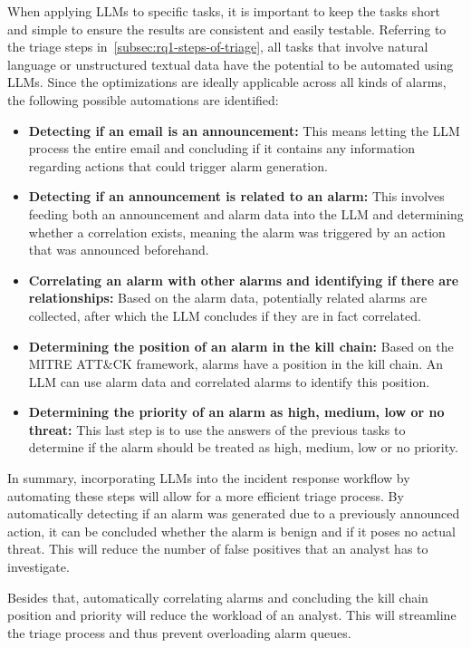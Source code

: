 When applying LLMs to specific tasks, it is important to keep the tasks short and simple to ensure the results are
consistent and easily testable.
Referring to the triage steps in\ \ref{subsec:rq1-steps-of-triage}, all tasks that involve natural language or
unstructured textual data have the potential to be automated using LLMs.
Since the optimizations are ideally applicable across all kinds of alarms, the following possible automations are
identified:
\begin{itemize}
    \item \textbf{Detecting if an email is an announcement:}
    This means letting the LLM process the entire email and concluding if it contains any information regarding actions
    that could trigger alarm generation.

    \item \textbf{Detecting if an announcement is related to an alarm:}
    This involves feeding both an announcement and alarm data into the LLM and determining whether a correlation
    exists, meaning the alarm was triggered by an action that was announced beforehand.

    \item \textbf{Correlating an alarm with other alarms and identifying if there are relationships:}
    Based on the alarm data, potentially related alarms are collected, after which the LLM concludes if they are in
    fact correlated.

    \item \textbf{Determining the position of an alarm in the kill chain:}
    Based on the MITRE ATT\&CK framework, alarms have a position in the kill chain.
    An LLM can use alarm data and correlated alarms to identify this position.

    \item \textbf{Determining the priority of an alarm as high, medium, low or no threat:}
    This last step is to use the answers of the previous tasks to determine if the alarm should be treated as high,
    medium, low or no priority.
\end{itemize}

In summary, incorporating LLMs into the incident response workflow by automating these steps will allow for a more
efficient triage process.
By automatically detecting if an alarm was generated due to a previously announced action, it can be concluded
whether the alarm is benign and if it poses no actual threat.
This will reduce the number of false positives that an analyst has to investigate.

Besides that, automatically correlating alarms and concluding the kill chain position and priority will reduce the
workload of an analyst.
This will streamline the triage process and thus prevent overloading alarm queues.